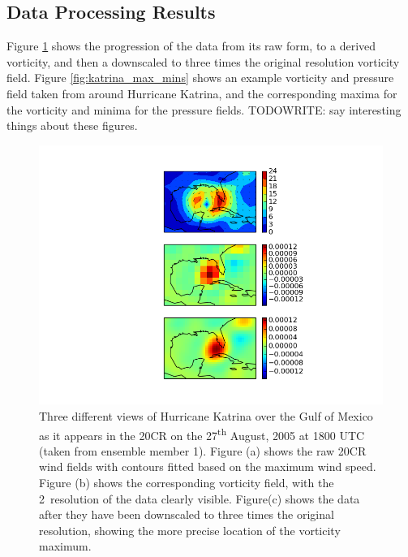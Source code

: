 \documentclass[pdftex,12pt,a4paper]{report}
\newcommand{\ts}{\textsuperscript}
\begin{document}
\subsection{Data Processing Results}

Figure \ref{fig:katrina_data_proc} shows the progression of the data from its raw form, to a derived
vorticity, and then a downscaled to three times the original resolution vorticity field. Figure
\ref{fig:katrina_max_mins} shows an example vorticity and pressure field taken from around Hurricane
Katrina, and the corresponding maxima for the vorticity and minima for the pressure fields.
TODOWRITE:
say interesting things about these figures.

\begin{figure}[hb!]
    \centering
    \includegraphics[width=\textwidth]{figures/katrina_data_proc}
    \caption{Three different views of Hurricane Katrina over the Gulf of Mexico as it appears in the
        20CR on the 27\ts{th} August, 2005 at 1800 UTC (taken from ensemble member 1). Figure (a)
        shows the raw 20CR wind fields with contours fitted based on the maximum wind speed. Figure
        (b) shows the corresponding vorticity field, with the 2\textdegree\ resolution of the data
        clearly visible. Figure(c) shows the data after they have been downscaled to three times the
        original resolution, showing the more precise location of the vorticity maximum.}
    \label{fig:katrina_data_proc}
\end{figure}
\end{document}
